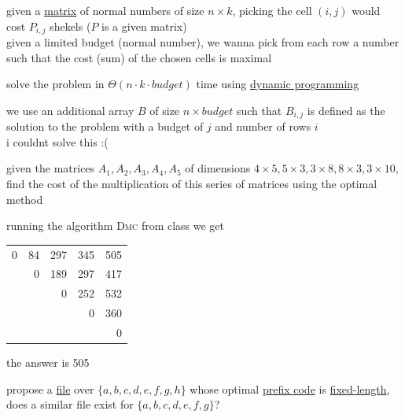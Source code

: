 \documentclass[a4paper,12pt]{article}
\newcommand{\?}{\stackrel{?}{=}}
\begin{document}
\begin{question}
given a \href{linear_algebra2.org}{matrix} of normal numbers of size \(n \times k\), picking the cell \((i,j)\) would cost \(P_{i,j}\) shekels (\(P\) is a given matrix)\\[0pt]
given a limited budget (normal number), we wanna pick from each row a number such that the cost (sum) of the chosen cells is maximal\\[0pt]
\begin{subquestion}
solve the problem in \(\Theta(n \cdot k \cdot budget)\) time using \href{20230102173117-dynamic_programming.org}{dynamic programming}\\[0pt]
\begin{answer}
we use an additional array \(B\) of size \(n \times budget\) such that \(B_{i,j}\) is defined as the solution to the problem with a budget of \(j\) and number of rows \(i\)\\[0pt]
i couldnt solve this :(\\[0pt]
\end{answer}
\end{subquestion}
\end{question}
\begin{question}
given the matrices \(A_1,A_2,A_3,A_4,A_5\) of dimensions \(4 \times 5, 5 \times 3, 3 \times 8, 8 \times 3, 3 \times 10\), find the cost of the multiplication of this series of matrices using the optimal method\\[0pt]
\begin{answer}
running the algorithm \textsc{Dmc} from class we get\\[0pt]
\begin{tabular}{rrrrr}
0 & 84 & 297 & 345 & 505\\[0pt]
 & 0 & 189 & 297 & 417\\[0pt]
 &  & 0 & 252 & 532\\[0pt]
 &  &  & 0 & 360\\[0pt]
 &  &  &  & 0\\[0pt]
\end{tabular}
the answer is 505\\[0pt]
\end{answer}
\end{question}
\begin{question}
propose a \href{20230119162026-file.org}{file} over \(\{a,b,c,d,e,f,g,h\}\) whose optimal \href{20230119174917-prefix_code.org}{prefix code} is \href{20230119170007-fixed_length_code_word.org}{fixed-length}, does a similar file exist for \(\{a,b,c,d,e,f,g\}\)?\\[0pt]
\end{question}
\end{document}
